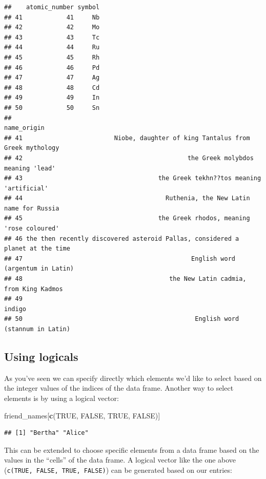 \documentclass[]{tufte-book}
\newenvironment{Shaded}{\begin{snugshade}}{\end{snugshade}}
\newcommand{\KeywordTok}[1]{\textcolor[rgb]{0.13,0.29,0.53}{\textbf{{#1}}}}
\newcommand{\OtherTok}[1]{\textcolor[rgb]{0.56,0.35,0.01}{{#1}}}
\newcommand{\NormalTok}[1]{{#1}}
\theoremstyle{definition}
\theoremstyle{definition}
\theoremstyle{remark}
\begin{document}
\begin{verbatim}
##    atomic_number symbol
## 41            41     Nb
## 42            42     Mo
## 43            43     Tc
## 44            44     Ru
## 45            45     Rh
## 46            46     Pd
## 47            47     Ag
## 48            48     Cd
## 49            49     In
## 50            50     Sn
##                                                                      name_origin
## 41                         Niobe, daughter of king Tantalus from Greek mythology
## 42                                             the Greek molybdos meaning 'lead'
## 43                                     the Greek tekhn??tos meaning 'artificial'
## 44                                       Ruthenia, the New Latin name for Russia
## 45                                     the Greek rhodos, meaning 'rose coloured'
## 46 the then recently discovered asteroid Pallas, considered a planet at the time
## 47                                              English word (argentum in Latin)
## 48                                        the New Latin cadmia, from King Kadmos
## 49                                                                        indigo
## 50                                               English word (stannum in Latin)
\end{verbatim}

\subsection{Using logicals}\label{using-logicals}

As you've seen we can specify directly which elements we'd like to
select based on the integer values of the indices of the data frame.
Another way to select elements is by using a logical vector:

\begin{Shaded}
\begin{Highlighting}[]
\NormalTok{friend_names[}\KeywordTok{c}\NormalTok{(}\OtherTok{TRUE}\NormalTok{, }\OtherTok{FALSE}\NormalTok{, }\OtherTok{TRUE}\NormalTok{, }\OtherTok{FALSE}\NormalTok{)]}
\end{Highlighting}
\end{Shaded}

\begin{verbatim}
## [1] "Bertha" "Alice"
\end{verbatim}

This can be extended to choose specific elements from a data frame based
on the values in the ``cells'' of the data frame. A logical vector like
the one above (\texttt{c(TRUE,\ FALSE,\ TRUE,\ FALSE)}) can be generated
based on our entries:
\end{document}
